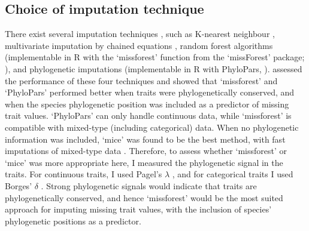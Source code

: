 \clearpage

\subsection{Choice of imputation technique}
There exist several imputation techniques \citep{Penone2014, Debastiani2021, Johnson2021}, such as K-nearest neighbour \citep{Troyanskaya2001}, multivariate imputation by chained equations \citep{micepackage}, random forest algorithms (implementable in R with the `missforest' function from the `missForest' package; \cite{Stekhoven2012, Stekhoven2016}), and phylogenetic imputations (implementable in R with PhyloPars, \cite{Bruggeman2009}). \citet{Penone2014} assessed the performance of these four techniques and showed that `missforest' and `PhyloPars' performed better when traits were phylogenetically conserved, and when the species phylogenetic position was included as a predictor of missing trait values. `PhyloPars' can only handle continuous data, while `missforest' is compatible with mixed-type (including categorical) data. When no phylogenetic information was included, `mice' was found to be the best method, with fast imputations of mixed-type data \citep{Penone2014}. Therefore, to assess whether `missforest' or `mice' was more appropriate here, I measured the phylogenetic signal in the traits. For continuous traits, I used Pagel’s $\lambda$ \citep{Pagel1999}, and for categorical traits I used Borges’ $\delta$ \citep{Borges2018}. Strong phylogenetic signals would indicate that traits are phylogenetically conserved, and hence `missforest' would be the most suited approach for imputing missing trait values, with the inclusion of species’ phylogenetic positions as a predictor. 

